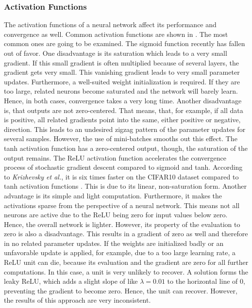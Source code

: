 \subsubsection{Activation Functions}
\label{sec:improving-performance-activation-functions}
The activation functions of a neural network affect its performance and convergence as well.
Common activation functions are shown in .
The most common ones are going to be examined.
The sigmoid function recently has fallen out of favor.
One disadvantage is its saturation which leads to a very small gradient.
If this small gradient is often multiplied because of several layers, the gradient gets very small.
This vanishing gradient leads to very small parameter updates.
Furthermore, a well-suited weight initialization is required.
If they are too large, related neurons become saturated and the network will barely learn.
Hence, in both cases, convergence takes a very long time.
Another disadvantage is, that outputs are not zero-centered.
That means, that, for example, if all data is positive, all related gradients point into the same, either positive or negative, direction.
This leads to an undesired zigzag pattern of the parameter updates for several samples.
However, the use of mini-batches smooths out this effect.
The tanh activation function has a zero-centered output, though, the saturation of the output remains.
The ReLU activation function accelerates the convergence process of stochastic gradient descent compared to sigmoid and tanh.
According to \textit{Krizhevsky et al.}, it is six times faster on the CIFAR10 dataset \cite{Krizhevsky2009LearningML} compared to tanh activation functions \cite{Krizhevsky:2012:ICD:2999134.2999257}.
This is due to its linear, non-saturation form.
Another advantage is its simple and light computation.
Furthermore, it makes the activations sparse from the perspective of a neural network.
This means not all neurons are active due to the ReLU being zero for input values below zero.
Hence, the overall network is lighter.
However, its property of the evaluation to zero is also a disadvantage.
This results in a gradient of zero as well and therefore in no related parameter updates.
If the weights are initialized badly or an unfavorable update is applied, for example, due to a too large learning rate, a ReLU unit can die, because its evaluation and the gradient are zero for all further computations.
In this case, a unit is very unlikely to recover.
A solution forms the leaky ReLU, which adds a slight slope of like $\lambda = 0.01$ to the horizontal line of 0, preventing the gradient to become zero.
Hence, the unit can recover.
However, the results of this approach are very inconsistent.

